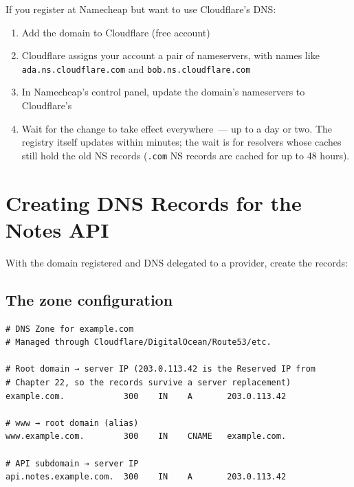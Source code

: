 If you register at Namecheap but want to use Cloudflare's DNS:

\begin{enumerate}
\def\labelenumi{\arabic{enumi}.}
\tightlist
\item
  Add the domain to Cloudflare (free account)
\item
  Cloudflare assigns your account a pair of nameservers, with names like \texttt{ada.ns.cloudflare.com} and \texttt{bob.ns.cloudflare.com}
\item
  In Namecheap's control panel, update the domain's nameservers to Cloudflare's
\item
  Wait for the change to take effect everywhere~--- up to a day or two. The registry itself updates within minutes; the wait is for resolvers whose caches still hold the old NS records (\texttt{.com} NS records are cached for up to 48 hours).
\end{enumerate}

\setcounter{section}{3}
\section{Creating DNS Records for the Notes API}\label{27-domain-and-dns:274-creating-dns-records-for-the-notes-api}

With the domain registered and DNS delegated to a provider, create the records:

\subsection*{The zone configuration}\label{27-domain-and-dns:the-zone-configuration}

\begin{outputbox}[short]
\begin{Verbatim}[fontsize=\codesize, breaklines, breakanywhere, breaksymbolleft={\tiny\textcolor{muted}{$\hookrightarrow$}}]
# DNS Zone for example.com
# Managed through Cloudflare/DigitalOcean/Route53/etc.

# Root domain → server IP (203.0.113.42 is the Reserved IP from
# Chapter 22, so the records survive a server replacement)
example.com.            300    IN    A       203.0.113.42

# www → root domain (alias)
www.example.com.        300    IN    CNAME   example.com.

# API subdomain → server IP
api.notes.example.com.  300    IN    A       203.0.113.42
\end{Verbatim}
\end{outputbox}

